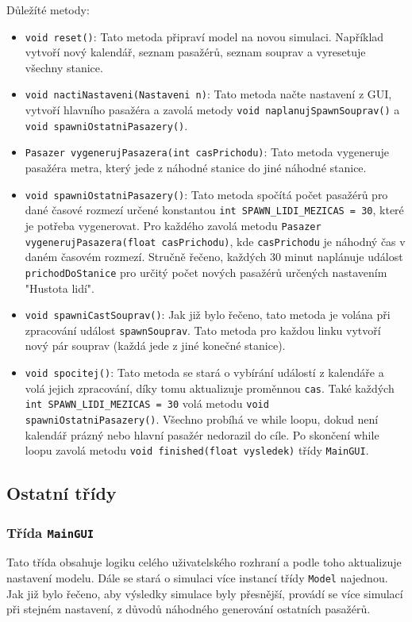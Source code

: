 \documentclass[12pt, a4paper]{article}
\begin{document}
Důležíté metody:
\begin{itemize}
    \item \texttt{void reset()}: Tato metoda připraví model na novou simulaci. Například vytvoří nový kalendář, seznam pasažérů, seznam souprav a vyresetuje všechny stanice.
    \item \texttt{void nactiNastaveni(Nastaveni n)}: Tato metoda načte nastavení z GUI, vytvoří hlavního pasažéra a zavolá metody \texttt{void naplanujSpawnSouprav()} a \texttt{void spawniOstatniPasazery()}.
    \item \texttt{Pasazer vygenerujPasazera(int casPrichodu)}: Tato metoda vygeneruje pasažéra metra, který jede z náhodné stanice do jiné náhodné stanice.
    \item \texttt{void spawniOstatniPasazery()}: Tato metoda spočítá počet pasažérů pro dané časové rozmezí určené konstantou \texttt{int SPAWN\_LIDI\_MEZICAS = 30}, které je potřeba vygenerovat. Pro každého zavolá metodu \texttt{Pasazer vygenerujPasazera(float casPrichodu)}, kde \texttt{casPrichodu} je náhodný čas v daném časovém rozmezí. Stručně řečeno, každých 30 minut naplánuje událost \texttt{prichodDoStanice} pro určitý počet nových pasažérů určených nastavením "Hustota lidí".
    \item \texttt{void spawniCastSouprav()}: Jak již bylo řečeno, tato metoda je volána při zpracování událost \texttt{spawnSouprav}. Tato metoda pro každou linku vytvoří nový pár souprav (každá jede z jiné konečné stanice).
    \item \texttt{void spocitej()}: Tato metoda se stará o vybírání událostí z kalendáře a volá jejich zpracování, díky tomu aktualizuje proměnnou \texttt{cas}. Také každých \texttt{int SPAWN\_LIDI\_MEZICAS = 30} volá metodu \texttt{void spawniOstatniPasazery()}. Všechno probíhá ve while loopu, dokud není kalendář prázný nebo hlavní pasažér nedorazil do cíle. Po skončení while loopu zavolá metodu \texttt{void finished(float vysledek)} třídy \texttt{MainGUI}.
\end{itemize}

\subsection{Ostatní třídy}
\subsubsection{Třída \texttt{MainGUI}}
Tato třída obsahuje logiku celého uživatelského rozhraní a podle toho aktualizuje nastavení modelu. Dále se stará o simulaci více instancí třídy \texttt{Model} najednou. Jak již bylo řečeno, aby výsledky simulace byly přesnější, provádí se více simulací při stejném nastavení, z důvodů náhodného generování ostatních pasažérů.
\end{document}
